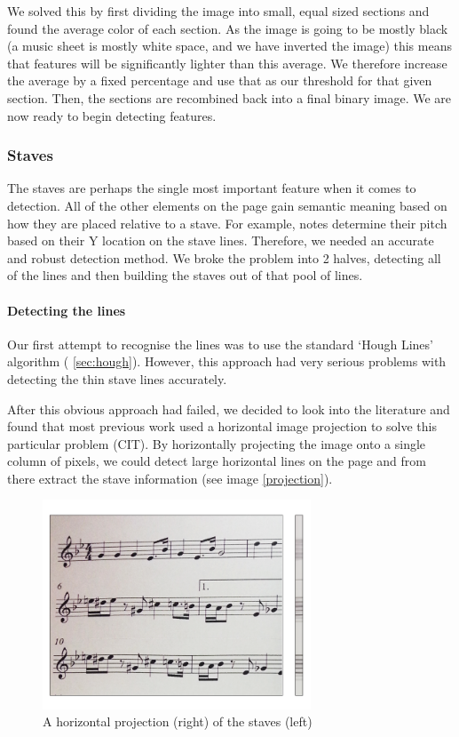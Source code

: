 We solved this by first dividing the image into small, equal sized sections and found the average color of each section. As the image is going to be mostly black (a music sheet is mostly white space, and we have inverted the image) this means that features will be significantly lighter than this average. We therefore increase the average by a fixed percentage and use that as our threshold for that given section. Then, the sections are recombined back into a final binary image. We are now ready to begin detecting features.

\subsubsection{Staves}

The staves are perhaps the single most important feature when it comes to detection.  All of the other elements on the page gain semantic meaning based on how they are placed relative to a stave. For example, notes determine their pitch based on their Y location on the stave lines. Therefore, we needed an accurate and robust detection method. We broke the problem into 2 halves, detecting all of the lines and then building the staves out of that pool of lines.

\paragraph{Detecting the lines}

Our first attempt to recognise the lines was to use the standard ‘Hough Lines’ algorithm ( \autoref{sec:hough}). However, this approach had very serious problems with detecting the thin stave lines accurately.

After this obvious approach had failed, we decided to look into the literature and found that most previous work used a horizontal image projection to solve this particular problem (CIT). By horizontally projecting the image onto a single column of pixels, we could detect large horizontal lines on the page and from there extract the stave information (see image \ref{projection}).

\begin{figure}[h!]
    \centering
    \includegraphics[width=80mm]{./assets/projection.png}
    \caption{A horizontal projection (right) of the staves (left)}
    \label{image:projection}
\end{figure}

